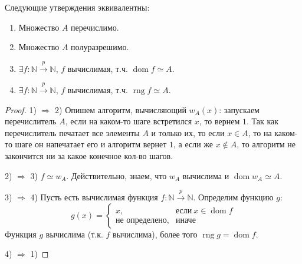\begin{statement}
  Следующие утверждения эквивалентны:
  \begin{enumerate}
    \item Множество $A$ перечислимо.
    \item Множество $A$ полуразрешимо.
    \item $\exists f : \mathbb{N} \overset{p}{\to} \mathbb{N}$, $f$ вычислимая, т.ч. $\operatorname{dom} f \simeq A$.
    \item $\exists f : \mathbb{N} \overset{p}{\to} \mathbb{N}$, $f$ вычислимая, т.ч. $\operatorname{rng} f \simeq A$.
  \end{enumerate}
  \begin{proof}
    1) $\Rightarrow$ 2) \newline
    Опишем алгоритм, вычисляющий $w_A(x)$: запускаем перечислитель $A$, если на каком-то шаге встретился $x$, то вернем $1$. Так как перечислитель печатает все элементы $A$ и только их, то если $x \in A$, то на каком-то шаге он напечатает его и алгоритм вернет $1$, а если же $x \notin A$, то алгоритм не закончится ни за какое конечное кол-во шагов. \newline
    
    2) $\Rightarrow$ 3) \newline
    $f \simeq w_A$. Действительно, знаем, что $w_A$ вычислима и $\operatorname{dom} w_A \simeq A$. \newline

    3) $\Rightarrow$ 4) \newline
    Пусть есть вычислимая функция $f : \mathbb{N} \overset{p}{\to} \mathbb{N}$. Определим функцию $g$:
    \[
      g(x) = \begin{cases}
        x, & \textit{если} \> x \in \operatorname{dom} f \\
        \textit{не определено}, & \textit{иначе}
      \end{cases}
    \]
    Функция $g$ вычислима (т.к. $f$ вычислима), более того $\operatorname{rng} g = \operatorname{dom} f$. \newline

    4) $\Rightarrow$ 1) \newline

  \end{proof}
\end{statement}